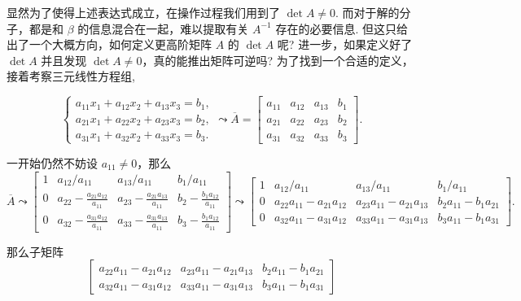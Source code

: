 \documentclass[10pt,openany]{article}
\theoremstyle{thmstyle} %
\theoremstyle{defstyle} %
\theoremstyle{prostyle} %
\theoremstyle{exastyle}
\theoremstyle{remstyle}
\begin{document}
显然为了使得上述表达式成立，在操作过程我们用到了 \( \det A \neq 0 \). 而对于解的分子，都是和 \( \beta \) 的信息混合在一起，难以提取有关 \( A^{-1} \) 存在的必要信息. 但这只给出了一个大概方向，如何定义更高阶矩阵 \( A \) 的 \(  \det A \) 呢? 进一步，如果定义好了 \( \det A \) 并且发现 \( \det A \neq 0 \)，真的能推出矩阵可逆吗? 为了找到一个合适的定义，接着考察三元线性方程组,

\[ \left\{ \begin{array}{l}
	a_{11}x_1+a_{12}x_2+a_{13}x_3=b_1, \\
	a_{21}x_1+a_{22}x_2+a_{23}x_3=b_2, \\
	a_{31}x_1+a_{32}x_2+a_{33}x_3=b_3.
\end{array}\right. \leadsto \overline{A}=\begin{bmatrix}
	a_{11} & a_{12} & a_{13} & b_1 \\
	a_{21} & a_{22} & a_{23} & b_2 \\
	a_{31} & a_{32} & a_{33} & b_3 
\end{bmatrix}. \]

一开始仍然不妨设 \( a_{11} \neq 0 \)，那么
\[ \overline{A} \leadsto  \begin{bmatrix}
	1 & a_{12}/a_{11} & a_{13}/a_{11} & b_1/a_{11} \\[2ex]
	0 & a_{22}-\frac{a_{21}a_{12}}{a_{11}} & a_{23}-\frac{a_{21}a_{13}}{a_{11}} & b_2-\frac{b_1a_{12}}{a_{11}} \\[2ex]
	0 & a_{32}-\frac{a_{31}a_{12}}{a_{11}} & a_{33}-\frac{a_{31}a_{13}}{a_{11}} & b_3-\frac{b_1a_{12}}{a_{11}}
\end{bmatrix} \leadsto \begin{bmatrix}
1 & a_{12}/a_{11} & a_{13}/a_{11} & b_1/a_{11} \\[2ex]
0 & a_{22} a_{11} - a_{21} a_{12} & a_{23} a_{11} - a_{21} a_{13} & b_2 a_{11} - b_1 a_{21} \\[2ex]
0 & a_{32} a_{11} - a_{31} a_{12} & a_{33} a_{11} - a_{31} a_{13} & b_3 a_{11} - b_1 a_{31}
\end{bmatrix}. \]

那么子矩阵
\[ \begin{bmatrix}
	a_{22} a_{11} - a_{21} a_{12} & a_{23} a_{11} - a_{21} a_{13} & b_2 a_{11} - b_1 a_{21} \\[2ex]
	 a_{32} a_{11} - a_{31} a_{12} & a_{33} a_{11} - a_{31} a_{13} & b_3 a_{11} - b_1 a_{31}
\end{bmatrix} \]
\end{document}
